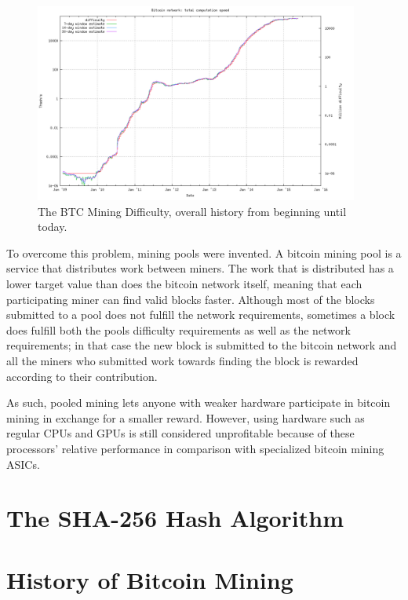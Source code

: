 \begin{figure}[htb]
    \centering
    \includegraphics[width=0.95\textwidth]{Figures/Bitcoin/Difficulty-all}
    \caption{The BTC Mining Difficulty, overall history from beginning until today.}
    \label{fig:difficulty}
\end{figure}

To overcome this problem, mining pools were invented. A bitcoin mining pool is a service that distributes
work between miners. The work that is distributed has a lower target value than does the bitcoin network
itself, meaning that each participating miner can find valid blocks faster. Although most of the blocks
submitted to a pool does not fulfill the network requirements, sometimes a block does fulfill both the
pools difficulty requirements as well as the network requirements; in that case the new block is
submitted to the bitcoin network and all the miners who submitted work towards finding the block
is rewarded according to their contribution.

As such, pooled mining lets anyone with weaker hardware participate in bitcoin mining in exchange for
a smaller reward. However, using hardware such as regular CPUs and GPUs is still considered unprofitable
because of these processors' relative performance in comparison with specialized bitcoin mining ASICs.

\section{The SHA-256 Hash Algorithm}

\section{History of Bitcoin Mining}

